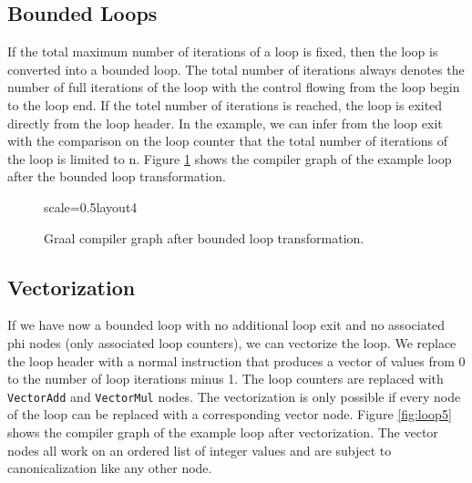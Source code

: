 \documentclass[twocolumn]{svjour3}
\begin{document}
\subsection{Bounded Loops}

If the total maximum number of iterations of a loop is fixed, then the loop is converted into a bounded loop.
The total number of iterations always denotes the number of full iterations of the loop with the control flowing from the loop begin to the loop end.
If the totel number of iterations is reached, the loop is exited directly from the loop header.
In the example, we can infer from the loop exit with the comparison on the loop counter that the total number of iterations of the loop is limited to n.
Figure \ref{fig:loop4} shows the compiler graph of the example loop after the bounded loop transformation.

\begin{figure}[h]
  \label{fig:loop4}
  \centering
\begin{digraphenv}{scale=0.5}{layout4}
\end{digraphenv}
  \caption{Graal compiler graph after bounded loop transformation.}
\end{figure}

\subsection{Vectorization}

If we have now a bounded loop with no additional loop exit and no associated phi nodes (only associated loop counters), we can vectorize the loop.
We replace the loop header with a normal instruction that produces a vector of values from 0 to the number of loop iterations minus 1.
The loop counters are replaced with \texttt{VectorAdd} and \texttt{VectorMul} nodes.
The vectorization is only possible if every node of the loop can be replaced with a corresponding vector node.
Figure \ref{fig:loop5} shows the compiler graph of the example loop after vectorization.
The vector nodes all work on an ordered list of integer values and are subject to canonicalization like any other node.
\end{document}
